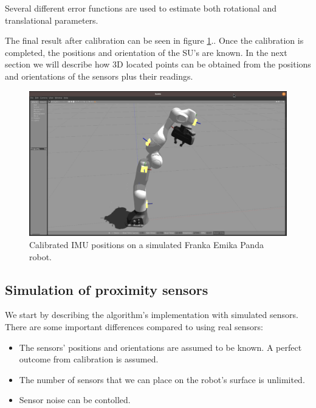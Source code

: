 \begin{enumerate}
    Several different error functions are used to estimate both rotational and translational parameters.

\end{enumerate}

The final result after calibration can be seen in figure \ref{fig:calibration_result}.. Once the calibration is completed, the positions and orientation of the SU's are known. In the next section we will describe how 3D located points can be obtained from the positions and orientations of the sensors plus their readings.

\begin{figure}[H]
    \caption[Calibration result]{
    Calibrated IMU positions on a simulated Franka Emika Panda robot.
    }
    \begin{center}
    \includegraphics[width=\textwidth]{figs/calibration_result.png}
    \end{center}
\label{fig:calibration_result}
\end{figure}

\subsection{Simulation of proximity sensors}
\label{ss:proximitysimulation}

We start by describing the algorithm's implementation with simulated sensors. There are some important differences compared to using real sensors:

\begin{itemize}
    \item The sensors' positions and orientations are assumed to be known. A perfect outcome from calibration is assumed.
    \item The number of sensors that we can place on the robot's surface is unlimited.
    \item Sensor noise can be contolled.
\end{itemize}

